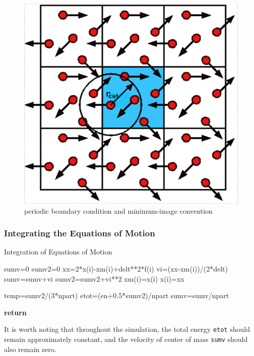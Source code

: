 \documentclass[letterpaper,12pt]{article}
\numberwithin{equation}{section}
\begin{document}
\begin{figure}[H]
    \centering
    \includegraphics[width=.6\textwidth]{pbcmi1.png}
    \caption{periodic boundary condition and minimum-image convention\cite{UCLpbc}}
\end{figure}

\subsubsection{Integrating the Equations of Motion}

\begin{algorithm}[H]
    \caption{Integration of Equations of Motion}
    \begin{algorithmic}[1]
        \State sumv=0
        \State sumv2=0
          
            \State xx=2*x(i)-xm(i)+delt**2*f(i) 
            \State vi=(xx-xm(i))/(2*delt)   
            \State sumv=sumv+vi    
            \State sumv2=sumv2+vi**2  
            \State xm(i)=x(i)  
            \State x(i)=xx   
        \EndFor

        \State temp=sumv2/(3*npart)  
        \State etot=(en+0.5*sumv2)/npart 
        \State sumv=sumv/npart

        \State \textbf{return}
        \EndFunction
    \end{algorithmic}
\end{algorithm}

It is worth noting that throughout the simulation, the total energy \texttt{etot} should remain approximately constant, and the velocity of center of mass \texttt{sumv} should also remain zero.
\end{document}
